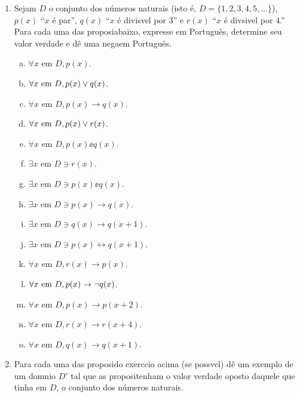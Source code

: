 \begin{enumerate}[{\bf 1.}]
\item Sejam $D$ o conjunto dos n\'umeros naturais (isto \'e, $D=\{1,2,3,4,5,\ldots\}$), $p(x)$ ``$x$ \'e par'', $q(x)$ ``$x$ \'e divis\ih vel por $3$'' e $r(x)$ ``$x$ \'e div\ih sivel por $4$.'' Para cada uma das proposi\coes abaixo, expresse em Portugu\^es, determine seu valor verdade e d\^e uma nega\cao em Portugu\^es.  
\begin{enumerate}[a)]
\item $\forall x \textrm{ em } D, p(x)$.
\item $\forall x \textrm{ em } D, p(x)\vee q(x)$.
\item $\forall x \textrm{ em } D, p(x)\to q(x)$.
\item $\forall x \textrm{ em } D, p(x)\vee r(x)$.
\item $\forall x \textrm{ em } D, p(x)\ee q(x)$.
\item $\exists x \textrm{ em } D \ni r(x)$.
\item $\exists x \textrm{ em } D \ni p(x)\ee q(x)$.
\item $\exists x \textrm{ em } D \ni p(x)\to q(x)$.
\item $\exists x \textrm{ em } D \ni q(x)\to q(x+1)$.
\item $\exists x \textrm{ em } D \ni p(x) \leftrightarrow q(x+1)$.
\item $\forall x \textrm{ em } D, r(x)\to p(x)$.
\item $\forall x \textrm{ em } D, p(x)\to\lnot q(x)$.
\item $\forall x \textrm{ em } D, p(x)\to p(x+2)$.
\item $\forall x \textrm{ em } D, r(x)\to r(x+4)$.
\item $\forall x \textrm{ em } D, q(x)\to q(x+1)$.
\end{enumerate}

\item Para cada uma das proposi\coes do exerc\ih cio acima (se poss\ih vel) d\^e um exemplo de um dom\ih nio $D'$ tal que as proposi\coes tenham o valor verdade oposto daquele que tinha em $D$, o conjunto dos n\'umeros naturais.


\end{enumerate}
